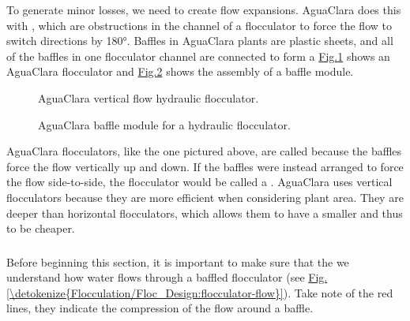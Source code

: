 \documentclass[letterpaper,10pt,english]{sphinxmanual}
\let\sphinxpxdimen\pdfpxdimen\else\newdimen\sphinxpxdimen
\begin{document}
To generate minor losses, we need to create flow expansions. AguaClara does this with , which are obstructions in the channel of a flocculator to force the flow to switch directions by 180°. Baffles in AguaClara plants are plastic sheets, and all of the baffles in one flocculator channel are connected to form a  \hyperref[\detokenize{Flocculation/Floc_Design:ac-flocculator}]{Fig.\@ \ref{\detokenize{Flocculation/Floc_Design:ac-flocculator}}} shows an AguaClara flocculator and \hyperref[\detokenize{Flocculation/Floc_Design:baffle-module}]{Fig.\@ \ref{\detokenize{Flocculation/Floc_Design:baffle-module}}} shows the assembly of a baffle module.

\begin{figure}[htbp]
\centering
\capstart

\noindent\sphinxincludegraphics[width=500\sphinxpxdimen]{{AC_flocculator}.jpg}
\caption{AguaClara vertical flow hydraulic flocculator.}\label{\detokenize{Flocculation/Floc_Design:id3}}\label{\detokenize{Flocculation/Floc_Design:ac-flocculator}}\end{figure}

\begin{figure}[htbp]
\centering
\capstart

\noindent\sphinxincludegraphics[width=500\sphinxpxdimen]{{Baffle_module}.jpg}
\caption{AguaClara baffle module for a hydraulic flocculator.}\label{\detokenize{Flocculation/Floc_Design:id4}}\label{\detokenize{Flocculation/Floc_Design:baffle-module}}\end{figure}

AguaClara flocculators, like the one pictured above, are called  because the baffles force the flow vertically up and down. If the baffles were instead arranged to force the flow side-to-side, the flocculator would be called a . AguaClara uses vertical flocculators because they are more efficient when considering plant area. They are deeper than horizontal flocculators, which allows them to have a smaller  and thus to be cheaper.


\subsubsection{}
\label{\detokenize{Flocculation/Floc_Design:finding-the-minor-loss-of-a-baffle}}
Before beginning this section, it is important to make sure that the we understand how water flows through a baffled flocculator (see \hyperref[\detokenize{Flocculation/Floc_Design:flocculator-flow}]{Fig.\@ \ref{\detokenize{Flocculation/Floc_Design:flocculator-flow}}}). Take note of the red lines, they indicate the compression of the flow around a baffle.
\end{document}
